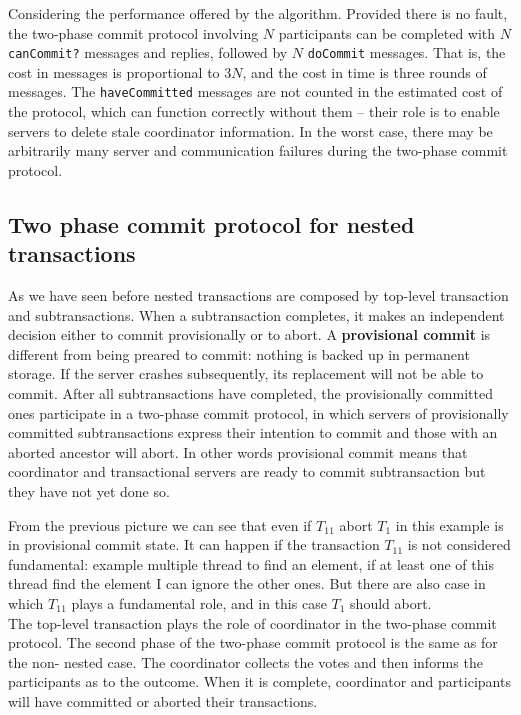 Considering the performance offered by the algorithm. Provided there is no fault, the two-phase commit protocol involving $N$ participants can be completed with $N$ \verb|canCommit?| messages and replies, followed by $N$ \verb|doCommit| messages. That is, the cost in messages is proportional to $3N$, and the cost in time is three rounds of messages. The \verb|haveCommitted| messages are not counted in the estimated cost of the protocol, which can function correctly without them – their role is to enable servers to delete stale coordinator information. In the worst case, there may be arbitrarily many server and communication failures during the two-phase commit protocol. 	


\subsection{Two phase commit protocol for nested transactions}

As we have seen before nested transactions are composed by top-level transaction and subtransactions. When a subtransaction completes, it makes an independent decision either to commit provisionally or to abort. A \textbf{provisional commit} is different from being preared to commit: nothing is backed up in permanent storage. If the server crashes subsequently, its replacement will not be able to commit. After all subtransactions have completed, the provisionally committed ones participate in a two-phase commit protocol, in which servers of provisionally committed subtransactions express their intention to commit and those with an aborted ancestor will abort.
In other words provisional commit means that coordinator and transactional servers are ready to commit subtransaction but they have not yet done so.

From the previous picture we can see that even if $T_{11}$ abort $T_1$ in this example is in provisional commit state. It can happen if the transaction $T_{11}$ is not considered fundamental: example multiple thread to find an element, if at least one of this thread find the element I can ignore the other ones. But there are also case in which $T_{11}$ plays a fundamental role, and in this case $T_1$ should abort.\\

The top-level transaction plays the role of coordinator in the two-phase commit protocol. The second phase of the two-phase commit protocol is the same as for the non- nested case. The coordinator collects the votes and then informs the participants as to the outcome. When it is complete, coordinator and participants will have committed or aborted their transactions.


